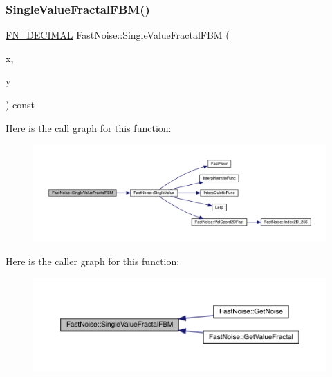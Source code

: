 \subsubsection{\texorpdfstring{Single\+Value\+Fractal\+F\+B\+M()}{SingleValueFractalFBM()}\hspace{0.1cm}{\footnotesize\ttfamily [1/2]}}
{\footnotesize\ttfamily \mbox{\hyperlink{_fast_noise_8h_a75a9ef6d2541c4921815b885bfd449c3}{F\+N\+\_\+\+D\+E\+C\+I\+M\+AL}} Fast\+Noise\+::\+Single\+Value\+Fractal\+F\+BM (\begin{DoxyParamCaption}\item[{\mbox{\hyperlink{_fast_noise_8h_a75a9ef6d2541c4921815b885bfd449c3}{F\+N\+\_\+\+D\+E\+C\+I\+M\+AL}}}]{x,  }\item[{\mbox{\hyperlink{_fast_noise_8h_a75a9ef6d2541c4921815b885bfd449c3}{F\+N\+\_\+\+D\+E\+C\+I\+M\+AL}}}]{y }\end{DoxyParamCaption}) const\hspace{0.3cm}{\ttfamily [private]}}

Here is the call graph for this function\+:
\nopagebreak
\begin{figure}[H]
\begin{center}
\leavevmode
\includegraphics[width=350pt]{class_fast_noise_a19cdde687bd3d06fa84ea16f52dfe96b_cgraph}
\end{center}
\end{figure}
Here is the caller graph for this function\+:
\nopagebreak
\begin{figure}[H]
\begin{center}
\leavevmode
\includegraphics[width=350pt]{class_fast_noise_a19cdde687bd3d06fa84ea16f52dfe96b_icgraph}
\end{center}
\end{figure}
\mbox{\label{class_fast_noise_a9189fa5c0fa9d9871290ade57dabe022}} 
